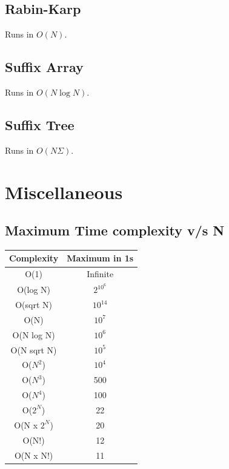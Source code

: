 \documentclass{article}
\begin{document}
\subsection{Rabin-Karp}
Runs in $O(N)$.


\subsection{Suffix Array}
Runs in $O(N \log N)$.


\subsection{Suffix Tree}
Runs in $O(N \Sigma)$.


\section{Miscellaneous}

\subsection{Maximum Time complexity v/s N}
\begin{table}[H]
\begin{tabular}{|c|c|}
\hline
Complexity     & Maximum in 1s \\ \hline
O(1)           & Infinite      \\ \hline
O(log N)       & $2^{10^{6}}$  \\ \hline
O(sqrt N)      & $10^{14}$     \\ \hline
O(N)           & $10^{7}$      \\ \hline
O(N log N)     & $10^{6}$      \\ \hline
O(N sqrt N)    & $10^{5}$      \\ \hline
O($N^{2}$)     & $10^{4}$      \\ \hline
O($N^{3}$)     & 500           \\ \hline
O($N^{4}$)     & 100           \\ \hline
O($2^{N}$)     & 22            \\ \hline
O(N x $2^{N}$) & 20            \\ \hline
O(N!)          & 12            \\ \hline
O(N x N!)      & 11            \\ \hline
\end{tabular}
\end{table}
\end{document}
